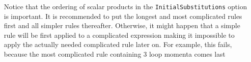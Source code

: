\documentclass[../FeynCalcManual.tex]{subfiles}
\begin{document}
Notice that the ordering of scalar products in the
\texttt{InitialSubstitutions} option is important. It is recommended to
put the longest and most complicated rules first and all simpler rules
thereafter. Otherwise, it might happen that a simple rule will be first
applied to a complicated expression making it impossible to apply the
actually needed complicated rule later on. For example, this fails,
because the most complicated rule containing 3 loop momenta comes last

\begin{Shaded}
\begin{Highlighting}[]
\ExtensionTok{=}\OperatorTok{[}\OperatorTok{,} \OperatorTok{\{}\OperatorTok{[\{\{}\OperatorTok{,} \OperatorTok{\},} \OperatorTok{\{}\OperatorTok{,} \OperatorTok{\},} \OperatorTok{\}],}\OperatorTok{[\{\{}\OperatorTok{,} \SpecialCharTok{{-}}\OperatorTok{\},} \OperatorTok{\{}\OperatorTok{,} \OperatorTok{\},} \OperatorTok{\}],} 
\OperatorTok{[\{\{}\OperatorTok{,} \SpecialCharTok{{-}}\SpecialCharTok{*}\SpecialCharTok{*}\OperatorTok{\},} \OperatorTok{\{}\OperatorTok{,} \OperatorTok{\},} \OperatorTok{\}],}\OperatorTok{[\{\{}\OperatorTok{,} \SpecialCharTok{{-}}\SpecialCharTok{*}\SpecialCharTok{*}\SpecialCharTok{*}\SpecialCharTok{*}\OperatorTok{\},} \OperatorTok{\{}\OperatorTok{,} \OperatorTok{\},} \OperatorTok{\}],} 
\OperatorTok{[\{\{}\OperatorTok{,} \SpecialCharTok{{-}}\SpecialCharTok{+}\OperatorTok{\},} \OperatorTok{\{}\SpecialCharTok{{-}}\SpecialCharTok{*}\SpecialCharTok{*}\SpecialCharTok{*}\OperatorTok{,} \OperatorTok{\},} \OperatorTok{\}],}\OperatorTok{[\{\{}\SpecialCharTok{+}\OperatorTok{,} \SpecialCharTok{{-}}\SpecialCharTok{*}\SpecialCharTok{*}\SpecialCharTok{*}\SpecialCharTok{*}\SpecialCharTok{+}\OperatorTok{\},} \OperatorTok{\{}\OperatorTok{,} \OperatorTok{\},} \OperatorTok{\}],} 

\end{Highlighting}
\end{Shaded}
\end{document}

